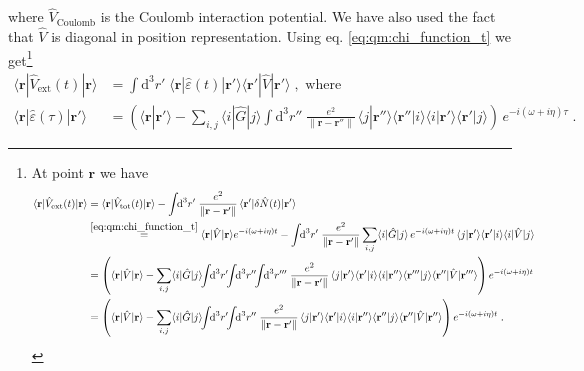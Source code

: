 \documentclass[a4paper,12pt]{article}
\begin{document}
    where $\hat V_\text{Coulomb}$ is the Coulomb interaction potential. We have also used the fact that $\hat V$ is diagonal in position representation. Using eq. \eqref{eq:qm:chi_function_t} we get\footnote{ %
At point $\mathbf{r}$ we have
    \begin{equation*}
    \begin{aligned}
        \langle \mathbf{r}|\hat V_\text{ext}(t) | \mathbf{r} \rangle 
            &= \langle \mathbf{r} | \hat V_\text{tot}(t) | \mathbf{r} \rangle - \int \!\! \text{d}^3 r' \;  \frac{e^2}{\| \mathbf{r} - \mathbf{r'} \|}\, \langle \mathbf{r'} | \delta \hat N(t) | \mathbf{r'} \rangle \\
            &\overset{\eqref{eq:qm:chi_function_t}}{=} \langle \mathbf{r} | \hat V | \mathbf{r} \rangle e^{-i (\omega + i\eta) t}- \int\!\! \text{d}^3 r' \; \frac{e^2}{\| \mathbf{r} - \mathbf{r'} \|} \sum_{i,j} \langle i | \hat G | j \rangle \, e^{-i (\omega + i\eta) t} \, \langle j |\mathbf{r'}\rangle\langle\mathbf{r'} | i \rangle\langle i | \hat V | j \rangle \\
            &= \left( \langle \mathbf{r} | \hat V | \mathbf{r} \rangle - \sum_{i,j} \langle i | \hat G | j \rangle \!\! \int\!\! \text{d}^3 r' \!\! \int\!\! \text{d}^3 r'' \!\! \int\!\! \text{d}^3 r''' \; \frac{e^2}{\| \mathbf{r} - \mathbf{r'} \|} \, \langle j |\mathbf{r'}\rangle\langle\mathbf{r'} | i \rangle \langle i | \mathbf{r''}\rangle \langle \mathbf{r'''} | j \rangle \langle \mathbf{r''} | \hat V | \mathbf{r'''} \rangle \right) e^{-i (\omega + i\eta) t} \\
            &= \left( \langle \mathbf{r} | \hat V | \mathbf{r} \rangle - \sum_{i,j} \langle i | \hat G | j \rangle \!\! \int\!\! \text{d}^3 r' \!\! \int\!\! \text{d}^3 r'' \; \frac{e^2}{\| \mathbf{r} - \mathbf{r'} \|} \, \langle j |\mathbf{r'}\rangle\langle\mathbf{r'} | i \rangle \langle i | \mathbf{r''}\rangle \langle \mathbf{r''} | j \rangle \langle \mathbf{r''} | \hat V | \mathbf{r''} \rangle \right) e^{-i (\omega + i\eta) t} \; .
    \end{aligned}
    \end{equation*}
} %
    \begin{equation*}
    \begin{aligned}
        \langle \mathbf{r} | \hat V_\text{ext}(t) | \mathbf{r} \rangle &= \int\!\! \text{d}^3 r' \; \langle \mathbf{r} | \hat \varepsilon(t) | \mathbf{r'} \rangle \langle \mathbf{r'} | \hat V | \mathbf{r'} \rangle \; , \text{ where} \\
        \langle \mathbf{r} | \hat \varepsilon(\tau) | \mathbf{r'} \rangle &= \left( \langle \mathbf{r} | \mathbf{r'} \rangle - \sum_{i,j} \langle i | \hat G | j \rangle \int\!\! \text{d}^3 r'' \; \frac{e^2}{\| \mathbf{r} - \mathbf{r''} \|} \, \langle j |\mathbf{r''}\rangle \langle\mathbf{r''} | i \rangle \langle i | \mathbf{r'}\rangle \langle \mathbf{r'} | j \rangle \right) \, e^{-i (\omega + i\eta) \tau}\; .
    \end{aligned}
    \end{equation*}
\end{document}
